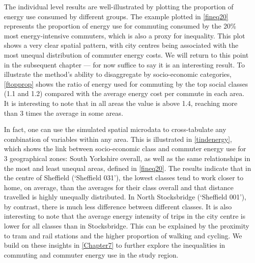 \documentclass[a4paper, 11pt, twoside]{Thesis}
\begin{document}
The individual level results are well-illustrated by plotting the proportion
of energy use consumed by different groups. The example plotted in
\cref{fineq20} represents the proportion of energy use for commuting
consumed by the 20\% most energy-intensive commuters, which is also a
proxy for inequality. This plot shows a very clear spatial pattern,
with city centres being associated with the most unequal distribution
of commuter energy costs. We will return to this point in the subsequent
chapter --- for now suffice to say it is an interesting result.
To illustrate the method's ability to disaggregate
by socio-economic categories, \cref{ftopprop} shows the ratio of energy
used for commuting by the top social classes (1.1 and 1.2) compared with
the average energy cost per commute in each area. It is interesting to
note that in all areas the value is above 1.4, reaching more than 3 times
the average in some areas.

In fact, one can use the simulated spatial microdata
to cross-tabulate any combination of variables within any area.
This is illustrated in \cref{tindenergy}, which shows the
link between socio-economic class and commuter energy use
for 3 geographical zones: South Yorkshire overall, as well as the same
relationships in the most and least unequal areas, defined in \cref{fineq20}.
The results indicate that in the centre of Sheffield (`Sheffield 031'),
the lowest classes tend to work closer to home, on average, than the averages for
their class overall and that distance travelled is highly unequally distributed.
In North Stocksbridge (`Sheffield 001'), by contrast, there is much less
difference between different classes. It is also interesting to note that
the average energy intensity of trips in the city centre is lower for all
classes than in Stocksbridge. This can be explained by the proximity to
tram and rail stations and the higher proportion of walking and cycling.
We build on these insights in \cref{Chapter7} to further explore the
inequalities in commuting and commuter energy use in the study region.
\end{document}
